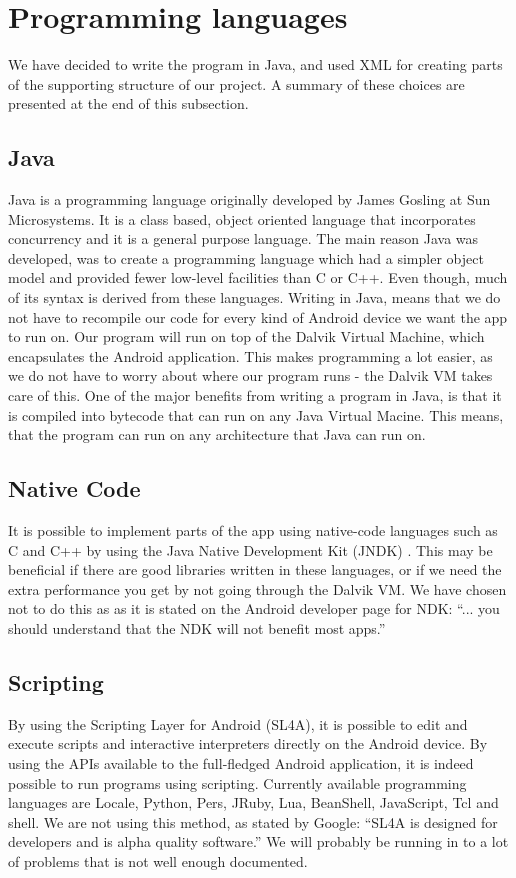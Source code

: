 
\section{Programming languages}
We have decided to write the program in Java, and used XML for creating parts of the supporting structure of our project. A summary of these choices are presented at the end of this subsection.

\subsection{Java}
Java is a programming language originally developed by James Gosling at Sun Microsystems\cite{bib:java}. It is a class based, object oriented language that incorporates concurrency and it is a general purpose language. The main reason Java was developed, was to create a programming language which had a simpler object model and provided fewer low-level facilities than C or C++. Even though, much of its syntax is derived from these languages.
\newline
\newline
Writing in Java, means that we do not have to recompile our code for every kind of Android device we want the app to run on. Our program will run on top of the Dalvik Virtual Machine, which encapsulates the Android application. This makes programming a lot easier, as we do not have to worry about where our program runs - the Dalvik VM takes care of this.
\newline
\newline
One of the major benefits from writing a program in Java, is that it is compiled into bytecode that can run on any Java Virtual Macine. This means, that the program can run on any architecture that Java can run on.

\subsection{Native Code}
It is possible to implement parts of the app using native-code languages such as C and C++ by using the Java Native Development Kit (JNDK) \cite{bib:andk}. This may be beneficial if there are good libraries written in these languages, or if we need the extra performance you get by not going through the Dalvik VM. We have chosen not to do this as as it is stated on the Android developer page for NDK: “... you should understand that the NDK will not benefit most apps.”

\subsection{Scripting}
By using the Scripting Layer for Android (SL4A), it is possible to edit and execute scripts and interactive interpreters directly on the Android device\cite{bib:slfa}. By using the APIs available to the full-fledged Android application, it is indeed possible to run programs using scripting. Currently available programming languages are Locale, Python, Pers, JRuby, Lua, BeanShell, JavaScript, Tcl and shell. We are not using this method, as stated by Google: “SL4A is designed for developers and is alpha quality software.” We will probably be running in to a lot of problems that is not well enough documented.

